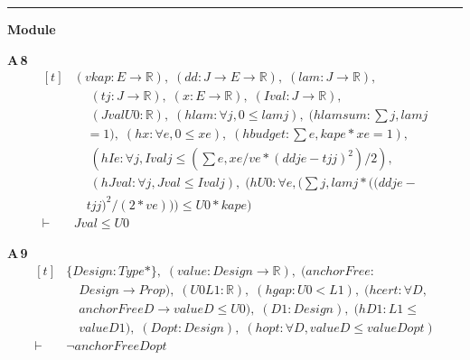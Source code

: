 \vspace{4pt}\noindent\rule{\columnwidth}{0.4pt}\par\vspace{2pt}
\noindent\textbf{Module }\par\vspace{3pt}

\noindent\textbf{A\,8}\quad{}
{\footnotesize\[ \begin{aligned}[t]
&(\mathit{v} \mathit{kap} : \mathit{E} \to \mathbb{R} ),\; (\mathit{dd} : \mathit{J} \to \mathit{E} \to \mathbb{R} ),\; (\mathit{lam} : \mathit{J} \to \mathbb{R} ),\\
&\quad \; (\mathit{tj} : \mathit{J} \to \mathbb{R} ),\; (\mathit{x} : \mathit{E} \to \mathbb{R} ),\; (\mathit{Ival} : \mathit{J} \to \mathbb{R} ),\\
&\quad \; (\mathit{Jval} \mathit{U0} : \mathbb{R} ),\; (\mathit{hlam} : \forall \mathit{j}, 0 \leq \mathit{lam} \mathit{j}),\; (\mathit{hlamsum} : \textstyle\sum \mathit{j}, \mathit{lam} \mathit{j}\\
&\quad = 1),\; (\mathit{hx} : \forall \mathit{e}, 0 \leq \mathit{x} \mathit{e}),\; (\mathit{hbudget} : \textstyle\sum \mathit{e}, \mathit{kap} \mathit{e} * \mathit{x} \mathit{e} = 1),\\
&\quad \; (\mathit{hIe} : \forall \mathit{j}, \mathit{Ival} \mathit{j} \leq (\textstyle\sum \mathit{e}, \mathit{x} \mathit{e} / \mathit{v} \mathit{e} * (\mathit{dd} \mathit{j} \mathit{e} - \mathit{tj} \mathit{j}) ^{2}) / 2),\\
&\quad \; (\mathit{hJval} : \forall \mathit{j}, \mathit{Jval} \leq \mathit{Ival} \mathit{j}),\; (\mathit{hU0} : \forall \mathit{e}, (\textstyle\sum \mathit{j}, \mathit{lam} \mathit{j} * ((\mathit{dd} \mathit{j} \mathit{e} -\\
&\quad \mathit{tj} \mathit{j}) ^{2} / (2 * \mathit{v} \mathit{e}))) \leq \mathit{U0} * \mathit{kap} \mathit{e})\\
\vdash\;&\mathit{Jval} \leq \mathit{U0}
\end{aligned} \]}

\noindent\textbf{A\,9}\quad{}
{\footnotesize\[ \begin{aligned}[t]
&\{ \mathit{Design} : \mathit{Type}*\},\; (\mathit{value} : \mathit{Design} \to \mathbb{R} ),\; (\mathit{anchorFree} :\\
&\quad \mathit{Design} \to \mathit{Prop}),\; (\mathit{U0} \mathit{L1} : \mathbb{R} ),\; (\mathit{hgap} : \mathit{U0} < \mathit{L1}),\; (\mathit{hcert} : \forall \mathit{D},\\
&\quad \mathit{anchorFree} \mathit{D} \to \mathit{value} \mathit{D} \leq \mathit{U0}),\; (\mathit{D1} : \mathit{Design}),\; (\mathit{hD1} : \mathit{L1} \leq\\
&\quad \mathit{value} \mathit{D1}),\; (\mathit{Dopt} : \mathit{Design}),\; (\mathit{hopt} : \forall \mathit{D}, \mathit{value} \mathit{D} \leq \mathit{value} \mathit{Dopt})\\
\vdash\;&\neg \mathit{anchorFree} \mathit{Dopt}
\end{aligned} \]}

